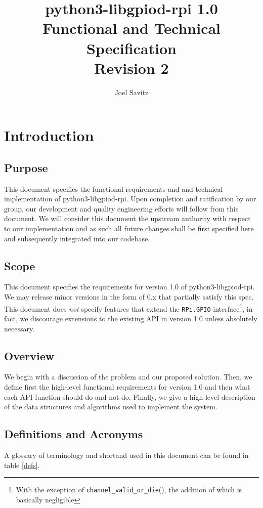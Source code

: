 \documentclass[12pt]{article}
\title{
{python3-libgpiod-rpi 1.0} \\ {Functional and Technical Specification } \\
{\normalsize Revision 2}
}
\author{Joel Savitz}
\begin{document}
\maketitle

\section{Introduction}
\subsection{Purpose}
This document specifies the functional requirements and and technical implementation of python3-libgpiod-rpi. Upon completion and ratification by our group, our development and quality engineering efforts will follow from this document. We will consider this document the upstream authority with respect to our implementation and as such all future changes shall be first specified here and subsequently integrated into our codebase.


\subsection{Scope}
This document specifies the requirements for version 1.0 of python3-libgpiod-rpi.
We may release minor versions in the form of 0.x that partially satisfy this spec.
This document does \textit{not} specify features that extend the \texttt{RPi.GPIO}
interface\footnote{With the exception of \texttt{channel\_valid\_or\_die}(), the addition of which is basically negligible}, in fact, we discourage extensions to the existing API
in version 1.0 unless absolutely necessary.


\subsection{Overview}
We begin with a discussion of the problem and our proposed solution. Then, we define first the high-level functional requirements for version 1.0 and then what each API function should do and not do. Finally, we give a high-level description of the data structures and algorithms used to implement the system.


\subsection{Definitions and Acronyms}

A glossary of terminology and shortand used in this document can be found in table \ref{defs}.
\end{document}
